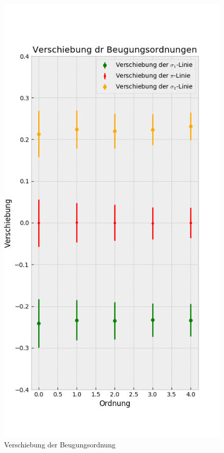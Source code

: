 \begin{landscape}
          \thispagestyle{empty}
          \begin{figure}
            \vspace*{-2cm}
            \caption{Verschiebung der Beugungsordnung}
            \hspace*{-5cm}\vspace{-1cm}
            \includegraphics[width=.45\paperwidth]{Auswertung/scatterorder/diff_sco10A}

\end{figure}
\end{landscape}
